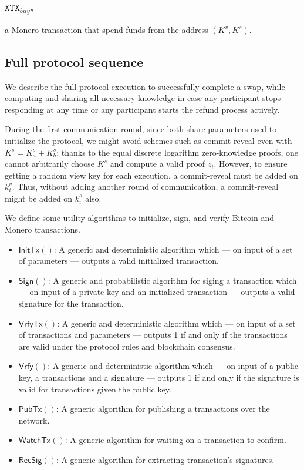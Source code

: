 \documentclass{llncs}
\newcommand{\XTX}{\texttt{XTX}}
\newcommand{\Sign}{\textsf{Sign}}
\newcommand{\Verify}{\textsf{Vrfy}}
\newcommand{\InitTx}{\textsf{InitTx}}
\newcommand{\VrfyTx}{\textsf{VrfyTx}}
\newcommand{\PubTx}{\textsf{PubTx}}
\newcommand{\WatchTx}{\textsf{WatchTx}}
\newcommand{\RecSig}{\textsf{RecSig}}
\begin{document}
\subsubsection{$\XTX_\textit{buy}$,}
a Monero transaction that spend funds from the address $(K^v,K^s)$.

\subsection{Full protocol sequence}
We describe the full protocol execution to successfully complete a swap, while computing and sharing all necessary knowledge in case any participant stops responding at any time or any participant starts the refund process actively.

During the first communication round, since both share parameters used to initialize the protocol, we might avoid schemes such as commit-reveal even with $K^s = K^s_a + K^s_b$: thanks to the equal discrete logarithm zero-knowledge proofs, one cannot arbitrarily choose $K^s$ and compute a valid proof $z_i$. However, to ensure getting a random view key for each execution, a commit-reveal must be added on $k^v_i$. Thus, without adding another round of communication, a commit-reveal might be added on $k^s_i$ also.

We define some utility algorithms to initialize, sign, and verify Bitcoin and Monero transactions.

\begin{itemize}
    \item $\InitTx()$: A generic and deterministic algorithm which --- on input of a set of parameters --- outputs a valid initialized transaction.
    \item $\Sign()$: A generic and probabilistic algorithm for siging a transaction which --- on input of a private key and an initialized transaction --- outputs a valid signature for the transaction.
    \item $\VrfyTx()$: A generic and deterministic algorithm which --- on input of a set of transactions and parameters --- outputs 1 if and only if the transactions are valid under the protocol rules and blockchain consensus.
    \item $\Verify()$: A generic and deterministic algorithm which --- on input of a public key, a transactions and a signature --- outputs 1 if and only if the signature is valid for transactions given the public key.
    \item $\PubTx()$: A generic algorithm for publishing a transactions over the network.
    \item $\WatchTx()$: A generic algorithm for waiting on a transaction to confirm.
    \item $\RecSig()$: A generic algorithm for extracting transaction's signatures.
\end{itemize}
\end{document}

